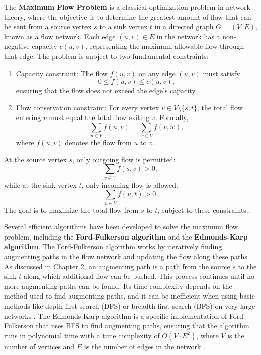 
The \textbf{Maximum Flow Problem} is a classical optimization problem in network theory, where the objective is to determine the greatest amount of flow that can be sent from a source vertex \( s \) to a sink vertex \( t \) in a directed graph \( G = (V, E) \), known as a flow network. Each edge \( (u, v) \in E \) in the network has a non-negative capacity \( c(u, v) \), representing the maximum allowable flow through that edge. The problem is subject to two fundamental constraints:
\begin{enumerate}
    \item Capacity constraint: The flow \( f(u, v) \) on any edge \( (u, v) \) must satisfy
   \[
   0 \leq f(u, v) \leq c(u, v),
   \]
   ensuring that the flow does not exceed the edge's capacity.
   \item Flow conservation constraint: For every vertex \( v \in V \setminus \{s, t\} \), the total flow entering \( v \) must equal the total flow exiting \( v \). Formally,
   \[
   \sum_{u \in V} f(u, v) = \sum_{w \in V} f(v, w),
   \]
   where \( f(u, v) \) denotes the flow from \( u \) to \( v \).
\end{enumerate}

\noindent At the source vertex \( s \), only outgoing flow is permitted:
\[
\sum_{v \in V} f(s, v) > 0,
\]
while at the sink vertex \( t \), only incoming flow is allowed:
\[
\sum_{u \in V} f(u, t) > 0.
\]
The goal is to maximize the total flow from \( s \) to \( t \), subject to these constraints.\cite{ford_fulkerson_1956, edmonds_karp_1972}.

Several efficient algorithms have been developed to solve the maximum flow problem, including the \textbf{Ford-Fulkerson algorithm} and the \textbf{Edmonds-Karp algorithm}. The Ford-Fulkerson algorithm works by iteratively finding augmenting paths in the flow network and updating the flow along these paths. As discussed in Chapter 2, an augmenting path is a path from the source \( s \) to the sink \( t \) along which additional flow can be pushed. This process continues until no more augmenting paths can be found. Its time complexity depends on the method used to find augmenting paths, and it can be inefficient when using basic methods like depth-first search (DFS) or breadth-first search (BFS) on very large networks \cite{ford_fulkerson_1956}. The Edmonds-Karp algorithm is a specific implementation of Ford-Fulkerson that uses BFS to find augmenting paths, ensuring that the algorithm runs in polynomial time with a time complexity of \( O(V \cdot E^2) \), where \( V \) is the number of vertices and \( E \) is the number of edges in the network \cite{edmonds_karp_1972}.


